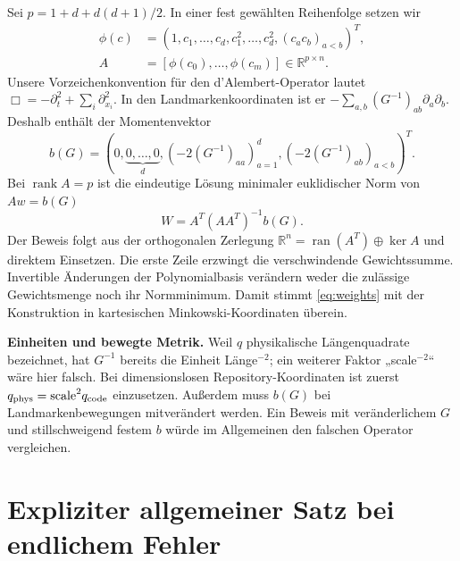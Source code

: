 \documentclass[11pt,a4paper]{article}
\theoremstyle{definition}\newtheorem{definition}{Definition}
\theoremstyle{remark}\newtheorem*{remark}{Bemerkung}
\newcommand{\R}{\mathbb{R}}
\newcommand{\rank}{\operatorname{rank}}
\begin{document}
Sei $p=1+d+d(d+1)/2$. In einer fest gewählten Reihenfolge setzen wir
\begin{align}
 \phi(c)&=(1,c_1,\ldots,c_d,c_1^2,\ldots,c_d^2,
                         (c_ac_b)_{a<b})^T,\\
 A&=[\phi(c_0),\ldots,\phi(c_m)]\in\R^{p\times n}.
\end{align}
Unsere Vorzeichenkonvention für den d'Alembert-Operator lautet $\Box=-\partial_t^2+\sum_i\partial_{x_i}^2$. In den Landmarkenkoordinaten ist er $-\sum_{a,b}(G^{-1})_{ab}\partial_a\partial_b$. Deshalb enthält der Momentenvektor
\begin{equation}\label{eq:b}
 b(G)=\left(0,\underbrace{0,\ldots,0}_{d},
             (-2(G^{-1})_{aa})_{a=1}^d,
             (-2(G^{-1})_{ab})_{a<b}\right)^T.
\end{equation}
Bei $\rank A=p$ ist die eindeutige Lösung minimaler euklidischer Norm von $Aw=b(G)$
\begin{equation}\label{eq:weights}
 W=A^T(AA^T)^{-1}b(G).
\end{equation}
Der Beweis folgt aus der orthogonalen Zerlegung $\R^n=\operatorname{ran}(A^T)\oplus\ker A$ und direktem Einsetzen. Die erste Zeile erzwingt die verschwindende Gewichtssumme. Invertible Änderungen der Polynomialbasis verändern weder die zulässige Gewichtsmenge noch ihr Normminimum. Damit stimmt \eqref{eq:weights} mit der Konstruktion in kartesischen Minkowski-Koordinaten überein.

\textbf{Einheiten und bewegte Metrik.} Weil $q$ physikalische Längenquadrate bezeichnet, hat $G^{-1}$ bereits die Einheit Länge$^{-2}$; ein weiterer Faktor „scale$^{-2}$“ wäre hier falsch. Bei dimensionslosen Repository-Koordinaten ist zuerst $q_{\rm phys}=\text{scale}^2q_{\rm code}$ einzusetzen. Außerdem muss $b(G)$ bei Landmarkenbewegungen mitverändert werden. Ein Beweis mit veränderlichem $G$ und stillschweigend festem $b$ würde im Allgemeinen den falschen Operator vergleichen.

\section{Expliziter allgemeiner Satz bei endlichem Fehler}
\end{document}

